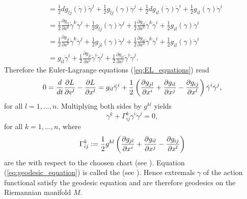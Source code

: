 \begin{example}
\begin{align*}
		&= \frac{1}{2}dg_{lj}(\dot{\gamma})\dot{\gamma}^j + \frac{1}{2}g_{lj}(\gamma)\ddot{\gamma}^j + \frac{1}{2}dg_{il}(\dot{\gamma})\dot{\gamma}^i + \frac{1}{2}g_{il}(\gamma)\ddot{\gamma}^i\\
		&= \frac{1}{2}\frac{\partial g_{lj}}{\partial x^k}\dot{\gamma}^k\dot{\gamma}^j + \frac{1}{2}g_{lj}(\gamma)\ddot{\gamma}^j + \frac{1}{2}\frac{\partial g_{il}}{\partial x^k}\dot{\gamma}^k\dot{\gamma}^i + \frac{1}{2}g_{il}(\gamma)\ddot{\gamma}^i\\
		&= \frac{1}{2}\frac{\partial g_{jl}}{\partial x^k}\dot{\gamma}^k\dot{\gamma}^j + \frac{1}{2}g_{jl}(\gamma)\ddot{\gamma}^j + \frac{1}{2}\frac{\partial g_{il}}{\partial x^k}\dot{\gamma}^k\dot{\gamma}^i + \frac{1}{2}g_{il}(\gamma)\ddot{\gamma}^i\\
		&= g_{il}\ddot{\gamma}^i + \frac{1}{2}\frac{\partial g_{jl}}{\partial x^i}\dot{\gamma}^i\dot{\gamma}^j + \frac{1}{2}\frac{\partial g_{il}}{\partial x^j}\dot{\gamma}^i\dot{\gamma}^j.
	\end{align*}
	Therefore the Euler-Lagrange equations (\ref{eq:EL_equations}) read
	\begin{equation*}
		0 = \frac{d}{dt}\frac{\partial L}{\partial v^l} - \frac{\partial L}{\partial x^l} = g_{il}\ddot{\gamma}^i + \frac{1}{2}\del[3]{\frac{\partial g_{jl}}{\partial x^i} + \frac{\partial g_{il}}{\partial x^j} - \frac{\partial g_{ij}}{\partial x^l}}\dot{\gamma}^i\dot{\gamma}^j,	
	\end{equation*}
	\noindent for all $l = 1,\dots,n$. Multiplying both sides by $g^{kl}$ yields
	\begin{equation}
		\label{eq:geodesic_equation}
		\ddot{\gamma}^k + \Gamma^k_{ij}\dot{\gamma}^i \dot{\gamma}^j = 0,
	\end{equation}
	\noindent for all $k = 1,\dots,n$, where
	\begin{equation*}
		\Gamma^k_{ij} := \frac{1}{2}g^{kl}\del[3]{\frac{\partial g_{jl}}{\partial x^i} + \frac{\partial g_{il}}{\partial x^j} - \frac{\partial g_{ij}}{\partial x^l}}
	\end{equation*}
	\noindent are the  with respect to the choosen chart (see \cite[70]{lee:Riemannian_manifolds:1997}). Equation (\ref{eq:geodesic_equation}) is called the  (see \cite[58]{lee:Riemannian_manifolds:1997}). Hence extremals $\gamma$ of the action functional satisfy the geodesic equation and are therefore geodesics on the Riemannian manifold $M$.
\end{example}

